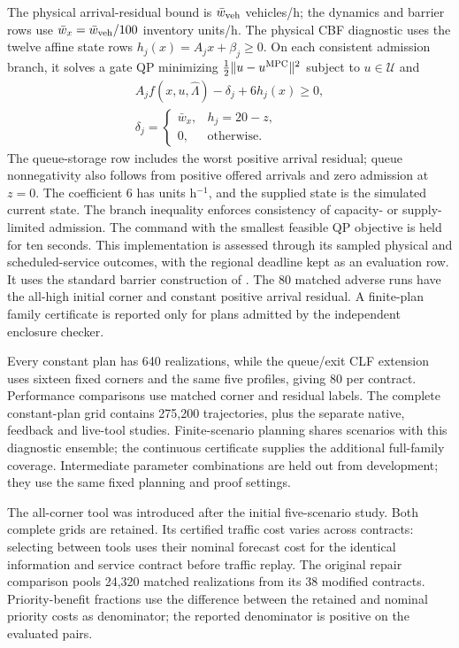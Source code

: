 \documentclass[preprint,12pt]{elsarticle}
\numberwithin{equation}{section}
\begin{document}
The physical arrival-residual bound is $\bar w_{\rm veh}$ vehicles/h;
the dynamics and barrier rows use
$\bar w_x=\bar w_{\rm veh}/100$ inventory units/h.
The physical CBF diagnostic uses the twelve affine state rows
$h_j(x)=A_jx+\beta_j\ge0$. On each consistent admission branch, it
solves a gate QP minimizing $\frac12\|u-u^{\rm MPC}\|^2$ subject to
$u\in\mathcal U$ and
\begin{equation}
\begin{gathered}
A_jf(x,u,\widehat\Lambda)-\delta_j+6h_j(x)\ge0,\\
\delta_j=\begin{cases}\bar w_x,&h_j=20-z,\\0,&\text{otherwise}.
\end{cases}
\end{gathered}
\label{eq:benchmark-cbf}
\end{equation}
The queue-storage row includes the worst positive arrival residual;
queue nonnegativity also follows from positive offered arrivals and
zero admission at $z=0$. The coefficient $6$ has units h$^{-1}$,
and the supplied state is the simulated current state. The branch
inequality enforces consistency of capacity- or supply-limited
admission. The command with the smallest feasible QP objective is held
for ten seconds. This implementation is assessed through its sampled
physical and scheduled-service outcomes, with the regional deadline
kept as an evaluation row. It uses the standard barrier construction
of \cite{ames2017}. The 80 matched adverse runs have the all-high
initial corner and constant positive arrival residual. A finite-plan
family certificate is reported only for plans admitted by the
independent enclosure checker.

Every constant plan has 640 realizations, while the queue/exit CLF
extension uses sixteen fixed corners and the same five profiles,
giving 80 per contract. Performance comparisons use matched corner and
residual labels. The complete constant-plan grid contains 275,200
trajectories, plus the separate native, feedback and live-tool studies.
Finite-scenario planning shares scenarios with this diagnostic ensemble;
the continuous certificate supplies the additional full-family coverage.
Intermediate parameter combinations are held out from development;
they use the same fixed planning and proof settings.

The all-corner tool was introduced after the initial five-scenario study.
Both complete grids are retained. Its certified traffic cost varies
across contracts: selecting between tools uses their nominal forecast
cost for the identical information and service contract before traffic
replay. The original repair comparison pools 24,320 matched
realizations from its 38 modified contracts. Priority-benefit fractions
use the difference between the retained and nominal priority costs as
denominator; the reported denominator is positive on the evaluated pairs.
\end{document}
